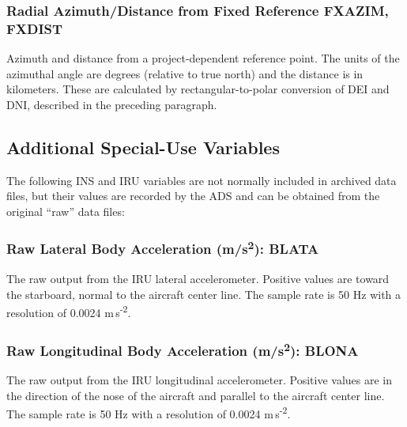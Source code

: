 \documentclass[
  english,
]{book}
\begin{document}
\hypertarget{fxaxim}{%
\subsubsection*{Radial Azimuth/Distance from Fixed Reference FXAZIM, FXDIST}\label{fxaxim}}

Azimuth and distance from a project-dependent reference point. The units of the azimuthal angle are degrees (relative to true north) and the distance is in kilometers. These are calculated by rectangular-to-polar conversion of DEI and DNI, described in the preceding paragraph.

\hypertarget{additional-special-use-variables}{%
\subsection{Additional Special-Use Variables}\label{additional-special-use-variables}}

The following INS and IRU variables are not normally included in archived data files, but their values are recorded by the ADS and can be obtained from the original ``raw'' data files:

\hypertarget{blata}{%
\subsubsection*{\texorpdfstring{Raw Lateral Body Acceleration (m/s\textsuperscript{2}): BLATA}{Raw Lateral Body Acceleration (m/s2): BLATA}}\label{blata}}

The raw output from the IRU lateral accelerometer. Positive values are toward the starboard, normal to the aircraft center line. The sample rate is 50 Hz with a resolution of 0.0024 m s\textsuperscript{-2}.

\hypertarget{blona}{%
\subsubsection*{\texorpdfstring{Raw Longitudinal Body Acceleration (m/s\textsuperscript{2}): BLONA}{Raw Longitudinal Body Acceleration (m/s2): BLONA}}\label{blona}}

The raw output from the IRU longitudinal accelerometer. Positive values are in the direction of the nose of the aircraft and parallel to the aircraft center line. The sample rate is 50 Hz with a resolution of 0.0024 m s\textsuperscript{-2}.
\end{document}
